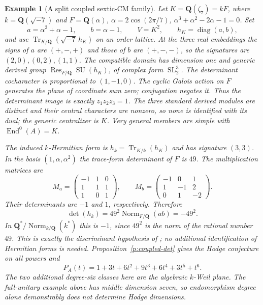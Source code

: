\documentclass[11pt,reqno]{article}
\theoremstyle{emphasizedplain}
\theoremstyle{emphasizeddefinition}
\newtheorem{example}[theorem]{Example}
\theoremstyle{emphasizeddefinition}
\DeclareMathOperator{\End}{End}
\DeclareMathOperator{\SL}{SL}
\DeclareMathOperator{\SU}{SU}
\DeclareMathOperator{\Res}{Res}
\DeclareMathOperator{\Tr}{Tr}
\newcommand{\Q}{\mathbf Q}
\begin{document}
\begin{example}[A split coupled sextic-CM family]
Let $K=\Q(\zeta_7)=kF$, where $k=\Q(\sqrt{-7})$ and
$F=\Q(\alpha)$, $\alpha=2\cos(2\pi/7)$,
$\alpha^3+\alpha^2-2\alpha-1=0$. Set
\[
 a=\alpha^2+\alpha-1,\qquad b=\alpha-1,\qquad
 V=K^2,\qquad h_K=\operatorname{diag}(a,b),
\]
and use $\Tr_{K/\Q}(\sqrt{-7}\,h_K)$ on an order lattice.
At the three real embeddings the signs of $a$ are $(+,-,+)$ and those
of $b$ are $(+,-,-)$, so the signatures are $(2,0),(0,2),(1,1)$.
The compatible domain has dimension one and generic derived group
$\Res_{F/\Q}\SU(h_K)$, of complex form $\SL_2^3$.
The determinant cocharacter is proportional to $(1,-1,0)$.
The cyclic Galois action on $F$ generates the plane of coordinate sum
zero; conjugation negates it. Thus the determinant image is exactly
$z_1z_2z_3=1$. The three standard derived modules are distinct and their
central characters are nonzero, so none is identified with its dual;
the generic centralizer is $K$. Very general members are simple with
$\End^0(A)=K$.

The induced $k$-Hermitian form is $h_k=\Tr_{K/k}(h_K)$ and has signature
$(3,3)$. In the basis $(1,\alpha,\alpha^2)$ the trace-form determinant
of $F$ is $49$. The multiplication matrices are
\[ M_a=\begin{pmatrix}-1&1&0\\1&1&1\\1&0&1\end{pmatrix},\qquad
M_b=\begin{pmatrix}-1&0&1\\1&-1&2\\0&1&-2\end{pmatrix}. \]
Their determinants are $-1$ and $1$, respectively. Therefore
\[
 \det(h_k)=49^2\operatorname{Norm}_{F/\Q}(ab)=-49^2.
\]
In $\Q^*/\operatorname{Norm}_{k/\Q}(k^*)$ this is $-1$, since
$49^2$ is the norm of the rational number $49$.
This is exactly the discriminant hypothesis of
\cite[Theorem 1.5.1]{Markman}; no additional identification of Hermitian
forms is needed. Proposition~\ref{p:coupled-det} gives the Hodge
conjecture on all powers and
\[ P_A(t)=1+3t+6t^2+9t^3+6t^4+3t^5+t^6. \]
The two additional degree-six classes here are the algebraic $k$-Weil
plane. The full-unitary example above has middle dimension seven, so
endomorphism degree alone demonstrably does not determine Hodge dimensions.
\end{example}
\end{document}
